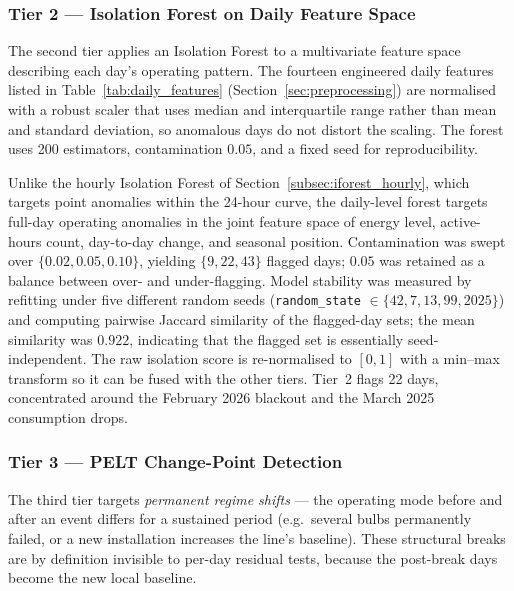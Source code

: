 \documentclass{article}
\begin{document}
\subsubsection{Tier 2 --- Isolation Forest on Daily Feature Space}

The second tier applies an Isolation Forest \cite{liu2008isolation,liu2012isolation} to a multivariate feature space describing each day's operating pattern. The fourteen engineered daily features listed in Table~\ref{tab:daily_features} (Section~\ref{sec:preprocessing}) are normalised with a robust scaler \cite{pedregosa2011scikit} that uses median and interquartile range rather than mean and standard deviation, so anomalous days do not distort the scaling. The forest uses 200 estimators, contamination $0.05$, and a fixed seed for reproducibility.

Unlike the hourly Isolation Forest of Section~\ref{subsec:iforest_hourly}, which targets point anomalies within the 24-hour curve, the daily-level forest targets full-day operating anomalies in the joint feature space of energy level, active-hours count, day-to-day change, and seasonal position. Contamination was swept over $\{0.02,0.05,0.10\}$, yielding $\{9,22,43\}$ flagged days; $0.05$ was retained as a balance between over- and under-flagging. Model stability was measured by refitting under five different random seeds (\texttt{random\_state} $\in\{42,7,13,99,2025\}$) and computing pairwise Jaccard similarity of the flagged-day sets; the mean similarity was $0.922$, indicating that the flagged set is essentially seed-independent. The raw isolation score is re-normalised to $[0,1]$ with a min--max transform so it can be fused with the other tiers. Tier~2 flags 22 days, concentrated around the February 2026 blackout and the March 2025 consumption drops.

\subsubsection{Tier 3 --- PELT Change-Point Detection}

The third tier targets \emph{permanent regime shifts} --- the operating mode before and after an event differs for a sustained period (e.g.\ several bulbs permanently failed, or a new installation increases the line's baseline). These structural breaks are by definition invisible to per-day residual tests, because the post-break days become the new local baseline.
\end{document}
